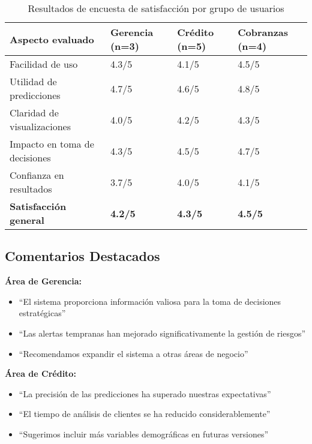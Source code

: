 \begin{table}[ht]
\centering
\begin{tabular}{|p{5cm}|p{2cm}|p{2cm}|p{2cm}|}
\hline
\textbf{Aspecto evaluado} & \textbf{Gerencia \newline (n=3)} & \textbf{Crédito \newline (n=5)} & \textbf{Cobranzas \newline (n=4)} \\
\hline
Facilidad de uso & 4.3/5 & 4.1/5 & 4.5/5 \\
\hline
Utilidad de predicciones & 4.7/5 & 4.6/5 & 4.8/5 \\
\hline
Claridad de visualizaciones & 4.0/5 & 4.2/5 & 4.3/5 \\
\hline
Impacto en toma de decisiones & 4.3/5 & 4.5/5 & 4.7/5 \\
\hline
Confianza en resultados & 3.7/5 & 4.0/5 & 4.1/5 \\
\hline
\textbf{Satisfacción general} & \textbf{4.2/5} & \textbf{4.3/5} & \textbf{4.5/5} \\
\hline
\end{tabular}
\caption{Resultados de encuesta de satisfacción por grupo de usuarios}
\label{tab:satisfaccion_usuarios}
\end{table}

\subsection{Comentarios Destacados}

\textbf{Área de Gerencia:}
\begin{itemize}
\item ``El sistema proporciona información valiosa para la toma de decisiones estratégicas''
\item ``Las alertas tempranas han mejorado significativamente la gestión de riesgos''
\item ``Recomendamos expandir el sistema a otras áreas de negocio''
\end{itemize}

\textbf{Área de Crédito:}
\begin{itemize}
\item ``La precisión de las predicciones ha superado nuestras expectativas''
\item ``El tiempo de análisis de clientes se ha reducido considerablemente''
\item ``Sugerimos incluir más variables demográficas en futuras versiones''
\end{itemize}

